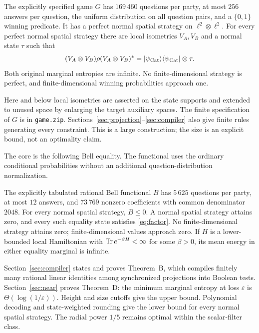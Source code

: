 \begin{theoremC}\label{thm:C}
The explicitly specified game $G$ has $169\,460$ questions per party, at most $256$ answers per question, the uniform distribution on all question pairs, and a $\{0,1\}$ winning predicate. It has a perfect normal spatial strategy on $\ell^2\otimes\ell^2$. For every perfect normal spatial strategy there are local isometries $V_A,V_B$ and a normal state $\tau$ such that
\begin{equation}\label{eq:factor}
(V_A\otimes V_B)\rho(V_A\otimes V_B)^*
 =|\psi_{\mathrm{Cat}}\rangle\langle\psi_{\mathrm{Cat}}|\otimes\tau.
\end{equation}
Both original marginal entropies are infinite. No finite-dimensional strategy is perfect, and finite-dimensional winning probabilities approach one.
\end{theoremC}

Here and below local isometries are asserted on the state supports and extended to unused space by enlarging the target auxiliary spaces. The finite specification of $G$ is in \texttt{game.zip}. Sections~\ref{sec:projection}--\ref{sec:compiler} also give finite rules generating every constraint. This is a large construction; the size is an explicit bound, not an optimality claim.

The core is the following Bell equality. The functional uses the ordinary conditional probabilities without an additional question-distribution normalization.
\begin{theoremA}\label{thm:A}
The explicitly tabulated rational Bell functional $B$ has $5\,625$ questions per party, at most $12$ answers, and $73\,769$ nonzero coefficients with common denominator $2048$. For every normal spatial strategy, $B\leq0$. A normal spatial strategy attains zero, and every such equality state satisfies \eqref{eq:factor}. No finite-dimensional strategy attains zero; finite-dimensional values approach zero. If $H$ is a lower-bounded local Hamiltonian with $\operatorname{Tr} e^{-\beta H}<\infty$ for some $\beta>0$, its mean energy in either equality marginal is infinite.
\end{theoremA}

Section~\ref{sec:compiler} states and proves Theorem~B, which compiles finitely many rational linear identities among synchronized projections into Boolean tests. Section~\ref{sec:near} proves Theorem~D: the minimum marginal entropy at loss $\varepsilon$ is $\Theta(\log(1/\varepsilon))$. Height and size cutoffs give the upper bound. Polynomial decoding and state-weighted rounding give the lower bound for every normal spatial strategy. The radial power $1/5$ remains optimal within the scalar-filter class.

